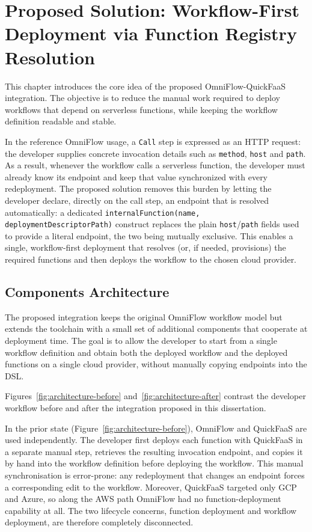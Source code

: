 \chapter{Proposed Solution: Workflow-First Deployment via Function Registry Resolution}
\label{ch:proposed_solution}

This chapter introduces the core idea of the proposed OmniFlow-QuickFaaS integration. The objective is to reduce the manual work required to deploy workflows that depend on serverless functions, while keeping the workflow definition readable and stable.

In the reference OmniFlow usage, a \texttt{Call} step is expressed as an HTTP request: the developer supplies concrete invocation details such as \texttt{method}, \texttt{host} and \texttt{path}. As a result, whenever the workflow calls a serverless function, the developer must already know its endpoint and keep that value synchronized with every redeployment. The proposed solution removes this burden by letting the developer declare, directly on the call step, an endpoint that is resolved automatically: a dedicated \texttt{internalFunction(name, deploymentDescriptorPath)} construct replaces the plain \texttt{host}/\texttt{path} fields used to provide a literal endpoint, the two being mutually exclusive. This enables a single, workflow-first deployment that resolves (or, if needed, provisions) the required functions and then deploys the workflow to the chosen cloud provider.

\section{Components Architecture}
\label{sec:components-architecture}

The proposed integration keeps the original OmniFlow workflow model but extends the toolchain with a small set of additional components that cooperate at deployment time. The goal is to allow the developer to start from a single workflow definition and obtain both the deployed workflow and the deployed functions on a single cloud provider, without manually copying endpoints into the DSL.

Figures~\ref{fig:architecture-before} and~\ref{fig:architecture-after} contrast the developer workflow before and after the integration proposed in this dissertation.

In the prior state (Figure~\ref{fig:architecture-before}), OmniFlow and QuickFaaS are used independently. The developer first deploys each function with QuickFaaS in a separate manual step, retrieves the resulting invocation endpoint, and copies it by hand into the workflow definition before deploying the workflow. This manual synchronisation is error-prone: any redeployment that changes an endpoint forces a corresponding edit to the workflow. Moreover, QuickFaaS targeted only GCP and Azure, so along the AWS path OmniFlow had no function-deployment capability at all. The two lifecycle concerns, function deployment and workflow deployment, are therefore completely disconnected.

